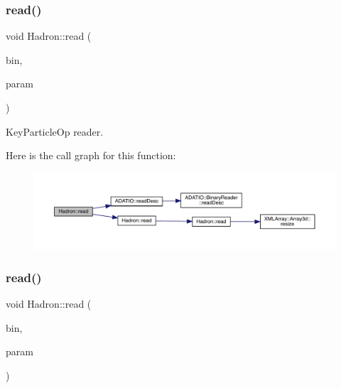 \subsubsection{\texorpdfstring{read()}{read()}\hspace{0.1cm}{\footnotesize\ttfamily [51/94]}}
{\footnotesize\ttfamily void Hadron\+::read (\begin{DoxyParamCaption}\item[{\mbox{\hyperlink{classADATIO_1_1BinaryReader}{Binary\+Reader}} \&}]{bin,  }\item[{\mbox{\hyperlink{structHadron_1_1KeyParticleOp__t}{Key\+Particle\+Op\+\_\+t}} \&}]{param }\end{DoxyParamCaption})}



Key\+Particle\+Op reader. 

Here is the call graph for this function\+:
\nopagebreak
\begin{figure}[H]
\begin{center}
\leavevmode
\includegraphics[width=350pt]{d1/daf/namespaceHadron_a22ce4d5ec6f9bf7a3504cb4b7b176c78_cgraph}
\end{center}
\end{figure}
\mbox{\label{namespaceHadron_a9478eee791b9cb2c8523893a334602e2}} 
\subsubsection{\texorpdfstring{read()}{read()}\hspace{0.1cm}{\footnotesize\ttfamily [52/94]}}
{\footnotesize\ttfamily void Hadron\+::read (\begin{DoxyParamCaption}\item[{\mbox{\hyperlink{classADATIO_1_1BinaryReader}{Binary\+Reader}} \&}]{bin,  }\item[{\mbox{\hyperlink{structHadron_1_1KeyHadronNPartNPtCorr__t_1_1NPoint__t}{Key\+Hadron\+N\+Part\+N\+Pt\+Corr\+\_\+t\+::\+N\+Point\+\_\+t}} \&}]{param }\end{DoxyParamCaption})}



